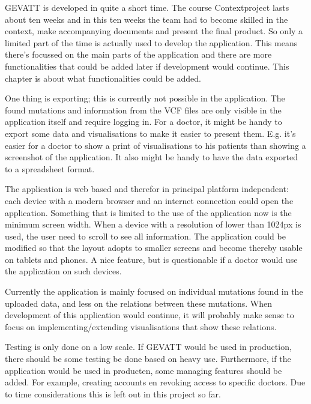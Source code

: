 GEVATT is developed in quite a short time. The course Contextproject lasts about ten weeks and in this ten weeks the team had to become skilled in the context, make accompanying documents	 and present the final product. So only a limited part of the time is actually used to develop the application. This means there's focussed on the main parts of the application and there are more functionalities that could be added later if development would continue. This chapter is about what functionalities  could be added.

One thing is exporting; this is currently not possible in the application. The found mutations and information from the VCF files are only visible in the application itself and require logging in. For a doctor, it might be handy to export some data and visualisations to make it easier to present them. E.g. it's easier for a doctor to show a print of visualisations to his patients than showing a screenshot of the application. It also might be handy to have the data exported to a spreadsheet format.

The application is web based and therefor in principal platform independent: each device with a modern browser and an internet connection could open the application. Something that is limited to the use of the application now is the minimum screen width. When a device with a resolution of lower than 1024px is used, the user need to scroll to see all information. The application could be modified so that the layout adopts to smaller screens and become thereby usable on tablets and phones. A nice feature, but is questionable if a doctor would use the application on such devices.

Currently the application is mainly focused on individual mutations found in the uploaded data, and less on the relations between these mutations. When development of this application would continue, it will probably make sense to focus on implementing/extending visualisations that show these relations.

Testing is only done on a low scale. If GEVATT would be used in production, there should be some testing be done based on heavy use. Furthermore, if the application would be used in producten, some managing features should be added. For example, creating accounts en revoking access to specific doctors. Due to time considerations this is left out in this project so far.